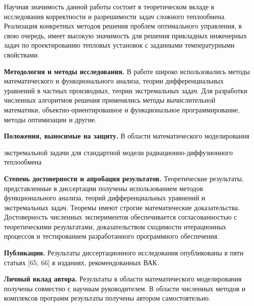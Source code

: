 Научная значимость данной работы состоит в теоретическом вкладе
в исследования корректности и разрешимости задач сложного теплообмена.
Реализация конкретных методов решения проблем оптимального управления,
в свою очередь, имеет высокую
значимость для решения прикладных инженерных задач по проектированию
тепловых установок с заданными температурными свойствами.


\textbf{Методология и методы исследования.}
В работе широко использовались методы математического и
функционального анализа, теории дифференциальных
уравнений в частных производных, теории экстремальных задач.
Для разработки численных алгоритмов решения
применялись методы вычислительной математики,
объектно-ориентированное и функциональное программирование,
методы оптимизации и другие.


\textbf{Положения, выносимые на защиту.}
В области математического моделирования
\begin{itemize}
     экстремальной задачи для стандартной модели радиационно-диффузионного теплообмена
\end{itemize}


\textbf{Степень достоверности и апробация результатов.}
Теоретические результаты, представленные в диссертации получены
использованием методов функционального анализа, теорий
дифференциальных уравнений и экстремальных задач.
Теоремы имеют строгие математические доказательства.
Достоверность численных экспериментов обеспечивается согласованностью
с теоретическими результатами, доказательством
сходимости итерационных процессов и тестированием разработанного программного обеспечения.

\textbf{Публикации.}
Результаты диссертационного исследования опубликованы в пяти статьях [65, 66] в изданиях, рекомендованных ВАК.


\textbf{Личный вклад автора.}
Результаты в области математического моделирования получены совместно с научным руководителем.
В области численных методов и комплексов программ результаты получены автором самостоятельно.
